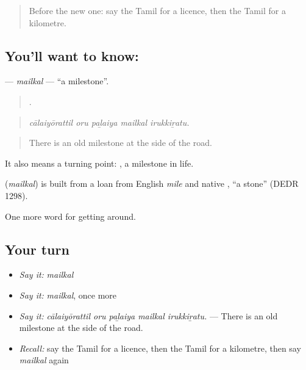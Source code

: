 \label{lesson:TA-C407-mailkal}



\begin{quote}
Before the new one: say the Tamil for a licence, then the Tamil for a kilometre.
\end{quote}

\subsection*{You'll want to know: }
\textbf{} — \emph{mailkal} — \textquotedblleft{}a milestone\textquotedblright{}.

\begin{quote}
    .
\end{quote}

\begin{quote}
\emph{cālaiyōrattil oru paḻaiya mailkal irukkiṟatu.}
\end{quote}

\begin{quote}
There is an old milestone at the side of the road.
\end{quote}

It also means a turning point:   , a milestone in life.

\begin{cousinweb}
\textbf{} (\emph{mailkal}) is built from a loan from English \emph{mile} and native , \textquotedblleft{}a stone\textquotedblright{} (DEDR 1298).
\end{cousinweb}

\begin{grammarlens}[title={What you've built}]
One more word for getting around.
\end{grammarlens}

\subsection*{Your turn}
\begin{itemize}
\raggedright
  \item \emph{Say it:} \emph{mailkal}
  \item \emph{Say it:} \emph{mailkal}, once more
  \item \emph{Say it:} \emph{cālaiyōrattil oru paḻaiya mailkal irukkiṟatu.} — There is an old milestone at the side of the road.
  \item \emph{Recall:} say the Tamil for a licence, then the Tamil for a kilometre, then say \emph{mailkal} again
\end{itemize}

